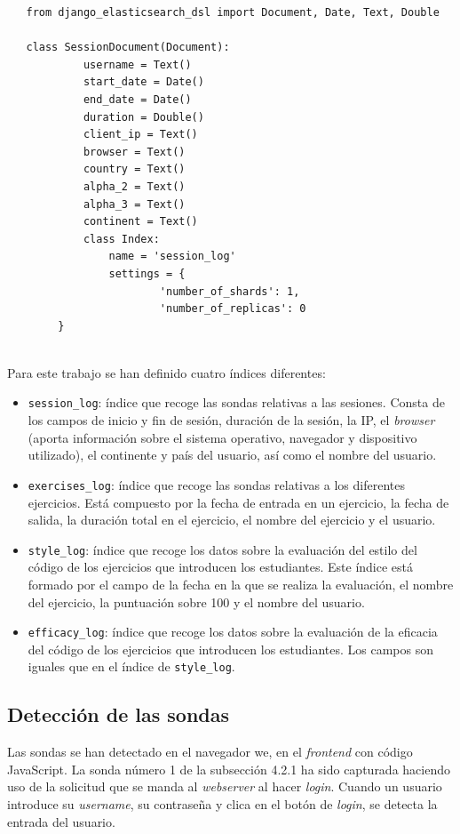 \begin{lstlisting}
   from django_elasticsearch_dsl import Document, Date, Text, Double
   
   class SessionDocument(Document):
    		username = Text()
  	  		start_date = Date()
   			end_date = Date()
    		duration = Double()
    		client_ip = Text()
    		browser = Text()
    		country = Text()
    		alpha_2 = Text()
    		alpha_3 = Text()
    		continent = Text()
    		class Index:
        		name = 'session_log'
        		settings = {
            			'number_of_shards': 1,
           				'number_of_replicas': 0
        }
\end{lstlisting} 
\\
Para este trabajo se han definido cuatro índices diferentes:

\begin{itemize}
\item \texttt{session\_log}: índice que recoge las sondas relativas a las sesiones. Consta de los campos de inicio y fin de sesión, duración de la sesión, la IP, el \textit{browser} (aporta información sobre el sistema operativo, navegador y dispositivo utilizado), el continente y país del usuario, así como el nombre del usuario.
\item \texttt{exercises\_log}: índice que recoge las sondas relativas a los diferentes ejercicios. Está compuesto por la fecha de entrada en un ejercicio, la fecha de salida, la duración total en el ejercicio, el nombre del ejercicio y el usuario.
\newpage
\item \texttt{style\_log}: índice que recoge los datos sobre la evaluación del estilo del código de los ejercicios que introducen los estudiantes. Este índice está formado por el campo de la fecha en la que se realiza la evaluación, el nombre del ejercicio, la puntuación sobre 100 y el nombre del usuario.
\item \texttt{efficacy\_log}: índice que recoge los datos sobre la evaluación de la eficacia del código de los ejercicios que introducen los estudiantes. Los campos son iguales que en el índice de \texttt{style\_log}.
\end{itemize}
\subsection{Detección de las sondas}
Las sondas se han detectado en el navegador we, en el \textit{frontend} con código JavaScript. La sonda número 1 de la subsección 4.2.1 ha sido capturada haciendo uso de la solicitud que se manda al \textit{webserver }al hacer \textit{login}. Cuando un usuario introduce su \textit{username}, su contraseña y clica en el botón de \textit{login}, se detecta la entrada del usuario. \\

